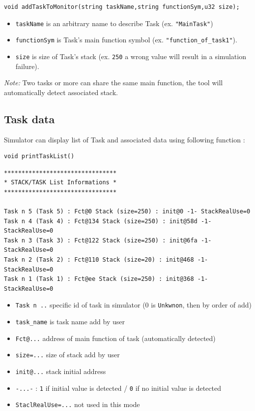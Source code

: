 \lstset{language=C++}
\begin{lstlisting}
void addTaskToMonitor(string taskName,string functionSym,u32 size);
\end{lstlisting}
\begin{itemize}
	\item  {\tt taskName} is an arbitrary name to describe Task (ex.  {\tt "MainTask"})
	\item  {\tt functionSym} is Task's main function symbol (ex.  {\tt "function\_of\_task1"}).
	\item  {\tt size}  is size of Task's stack (ex.  {\tt 250} a wrong value will result in a simulation failure).
\end{itemize}
\emph{Note:} Two tasks or more can share the same main function, the tool will automatically detect associated stack.

\subsection{Task data}
\noindent Simulator can display list of Task and associated data using following function :
\begin{lstlisting}
void printTaskList()
 \end{lstlisting}
 
 \begin{verbatim}
********************************
* STACK/TASK List Informations *
********************************

Task n 5 (Task 5) : Fct@0 Stack (size=250) : init@0 -1- StackRealUse=0
Task n 4 (Task 4) : Fct@134 Stack (size=250) : init@58d -1- StackRealUse=0
Task n 3 (Task 3) : Fct@122 Stack (size=250) : init@6fa -1- StackRealUse=0
Task n 2 (Task 2) : Fct@110 Stack (size=20) : init@468 -1- StackRealUse=0
Task n 1 (Task 1) : Fct@ee Stack (size=250) : init@368 -1- StackRealUse=0
\end{verbatim}

 \begin{itemize}
	\item  {\tt Task n ..} specific id of task in simulator (0 is {\tt Unkwnon}, then by order of add)
	\item  {\tt task\_name} is task name add by user
	\item  {\tt Fct@...} address of main function of task (automatically detected)
	\item  {\tt size=...} size of stack add by user
	\item  {\tt init@...}  stack initial address
	\item  {\tt -...-} : {\tt 1} if initial value is detected / {\tt 0} if no initial value is detected
	\item  {\tt StaclRealUse=...} not used in this mode
\end{itemize}

